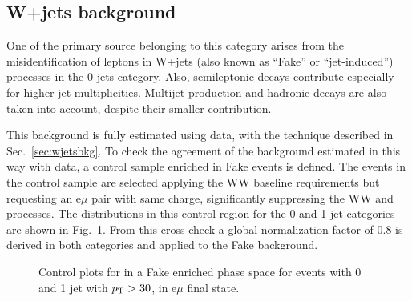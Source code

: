 \subsection{W+jets background}

One of the primary source belonging to this category arises from the misidentification of leptons in W+jets (also known as ``Fake'' or ``jet-induced'') processes in the 0 jets category. Also, semileptonic \ttbar decays contribute especially for higher jet multiplicities. Multijet production and hadronic \ttbar decays are also taken into account, despite their smaller contribution.

This background is fully estimated using data, with the technique described in Sec.~\ref{sec:wjetsbkg}. To check the agreement of the background estimated in this way with data, a control sample enriched in Fake events is defined. The events in the control sample are selected applying the WW baseline requirements but requesting an e$\mu$ pair with same charge, significantly suppressing the WW and \ttbar processes. The \mll distributions in this control region for the 0 and 1 jet categories are shown in Fig.~\ref{fig:13TeVsamesign}. From this cross-check a global normalization factor of 0.8 is derived in both categories and applied to the Fake background.

\begin{figure}[htb]
\centering
    \caption{
         Control plots for \mll in a Fake enriched phase space for events with 0 and 1 jet with $p_\mathrm{T} > 30$\GeV, in e$\mu$ final state.
         }\label{fig:13TeVsamesign}
\end{figure}

